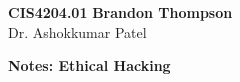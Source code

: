 \noindent
\textbf{CIS4204.01} \hfill \textbf{Brandon Thompson} \\
\normalsize Dr. Ashokkumar Patel\\

\begin{center}
\textbf{Notes: Ethical Hacking}
\end{center}